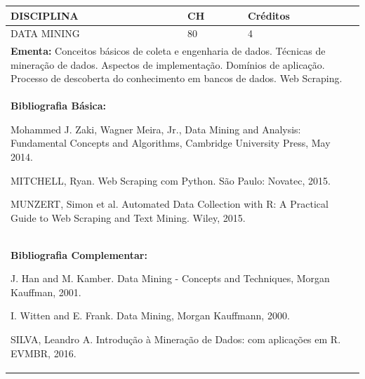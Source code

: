 \documentclass[a4paper, 12pt, openright, oneside, german, french, english, brazil]{abntex2}
\begin{document}
\begin{table}[!h]
  \footnotesize
  \centering
  \begin{tabular}{|p{100mm}|p{10mm}|p{20mm}|}
    \hline
    \textbf{DISCIPLINA} & \textbf{CH} & \textbf{Créditos} \\
    \hline
    DATA MINING & 80 & 4 \\
    \hline
    \multicolumn{3}{|p{130mm}|}{\textbf{Ementa:}  Conceitos básicos de coleta e engenharia de dados. Técnicas de mineração de dados. Aspectos de implementação. Domínios de aplicação. Processo de descoberta do conhecimento em bancos de dados. Web Scraping.} \\
    \hline
    \multicolumn{3}{|p{130mm}|}{\textbf{Bibliografia Básica:}

    Mohammed J. Zaki, Wagner Meira, Jr., Data Mining and Analysis: Fundamental Concepts and Algorithms, Cambridge University Press, May 2014.

MITCHELL, Ryan. Web Scraping com Python. São Paulo: Novatec, 2015.

MUNZERT, Simon et al. Automated Data Collection with R: A Practical Guide to Web Scraping and Text Mining. Wiley, 2015.
} \\
    \hline
    \multicolumn{3}{|p{130mm}|}{\textbf{Bibliografia Complementar:}

    J. Han and M. Kamber. Data Mining - Concepts and Techniques, Morgan Kauffman, 2001.

I. Witten and E. Frank. Data Mining, Morgan Kauffmann, 2000.

SILVA, Leandro A. Introdução à Mineração de Dados: com aplicações em R. EVMBR, 2016.
} \\
    \hline
  \end{tabular}
\end{table}
\end{document}
